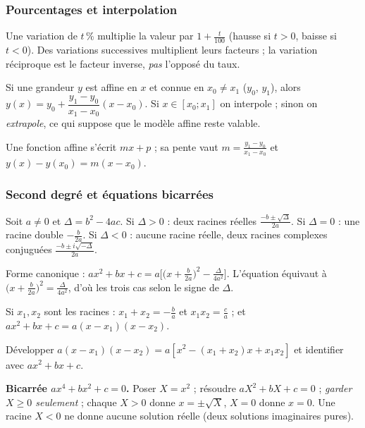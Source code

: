 \subsubsection*{Pourcentages et interpolation}
\begin{definition}
Une variation de $t\,\%$ multiplie la valeur par $1+\frac t{100}$ (hausse si $t>0$, baisse si $t<0$). Des variations successives multiplient leurs facteurs ; la variation réciproque est le facteur inverse, \emph{pas} l'opposé du taux.
\end{definition}
\begin{propriete}
Si une grandeur $y$ est affine en $x$ et connue en $x_0\ne x_1$ ($y_0$, $y_1$), alors $y(x)=y_0+\dfrac{y_1-y_0}{x_1-x_0}(x-x_0)$. Si $x\in[x_0;x_1]$ on interpole ; sinon on \emph{extrapole}, ce qui suppose que le modèle affine reste valable.
\end{propriete}
\begin{demonstration}
Une fonction affine s'écrit $mx+p$ ; sa pente vaut $m=\frac{y_1-y_0}{x_1-x_0}$ et $y(x)-y(x_0)=m(x-x_0)$.
\end{demonstration}

\subsubsection*{Second degré et équations bicarrées}
\begin{propriete}[Discriminant]
Soit $a\ne0$ et $\Delta=b^2-4ac$. Si $\Delta>0$ : deux racines réelles $\frac{-b\pm\sqrt\Delta}{2a}$. Si $\Delta=0$ : une racine double $-\frac b{2a}$. Si $\Delta<0$ : aucune racine réelle, deux racines complexes conjuguées $\frac{-b\pm i\sqrt{-\Delta}}{2a}$.
\end{propriete}
\begin{demonstration}
Forme canonique : $ax^2+bx+c=a\Big[\big(x+\frac b{2a}\big)^2-\frac\Delta{4a^2}\Big]$. L'équation équivaut à $\big(x+\frac b{2a}\big)^2=\frac\Delta{4a^2}$, d'où les trois cas selon le signe de $\Delta$.
\end{demonstration}
\begin{propriete}
Si $x_1,x_2$ sont les racines : $x_1+x_2=-\frac ba$ et $x_1x_2=\frac ca$ ; et $ax^2+bx+c=a(x-x_1)(x-x_2)$.
\end{propriete}
\begin{demonstration}
Développer $a(x-x_1)(x-x_2)=a[x^2-(x_1+x_2)x+x_1x_2]$ et identifier avec $ax^2+bx+c$.
\end{demonstration}
\begin{methode}
\textbf{Bicarrée $ax^4+bx^2+c=0$.} Poser $X=x^2$ ; résoudre $aX^2+bX+c=0$ ; \emph{garder $X\ge0$ seulement} ; chaque $X>0$ donne $x=\pm\sqrt X$, $X=0$ donne $x=0$. Une racine $X<0$ ne donne aucune solution réelle (deux solutions imaginaires pures).
\end{methode}

